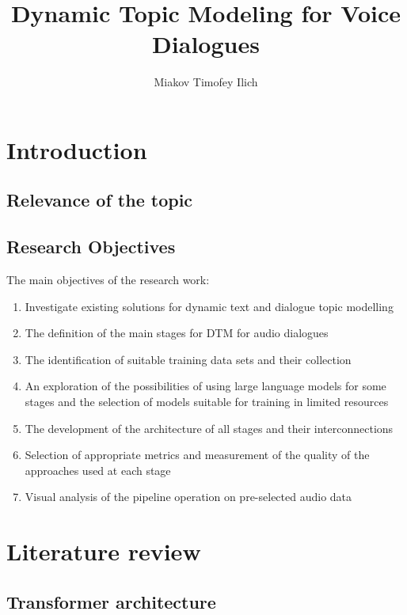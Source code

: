 \documentclass[PMI,VKR]{HSEUniversity}
\title{Dynamic Topic Modeling for Voice Dialogues}
\author{Miakov Timofey Ilich}
\begin{document}
\maketitle

\chapter{Introduction}



\section{Relevance of the topic}



\section{Research Objectives}

The main objectives of the research work:
\begin{enumerate}
    \item Investigate existing solutions for dynamic text and dialogue topic modelling
    \item The definition of the main stages for DTM for audio dialogues
    \item The identification of suitable training data sets and their collection
    \item An exploration of the possibilities of using large language models for some stages and the selection of models suitable for training in limited resources
    \item The development of the architecture of all stages and their interconnections
    \item Selection of appropriate metrics and measurement of the quality of the approaches used at each stage
    \item Visual analysis of the pipeline operation on pre-selected audio data
\end{enumerate}


\chapter{Literature review}

\section{Transformer architecture}
\end{document}

